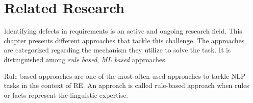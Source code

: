 \chapter{Related Research}
\label{chp:related_research}
Identifying defects in requirements is an active and ongoing research field.
This chapter presents different approaches that tackle this challenge.
The approaches are categorized regarding the mechanism they utilize to solve the task.
It is distinguished among \textit{rule based}, \textit{\ac{ML} based} approaches.

Rule-based approaches are one of the most often used approaches to tackle \ac{NLP} tasks in the context of \ac{RE}.
An approach is called rule-based approach when rules or facts represent the linguistic expertise. \parencite{Zhao:2020}



% 
